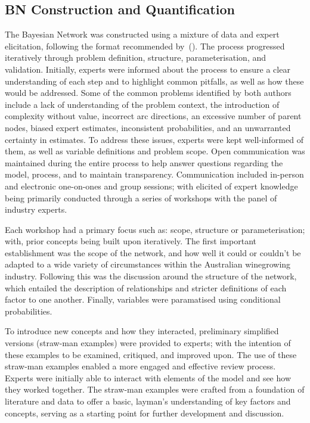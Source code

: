 \documentclass[fleqn,10pt]{wlscirep}
\begin{document}
\subsection*{BN Construction and Quantification}

The Bayesian Network was constructed using a mixture of data and expert elicitation, following the format recommended by~(\cite{korbBayesianArtificialIntelligence2011,pitchforthProposedValidationFramework2013}). The process progressed iteratively through problem definition, structure, parameterisation, and validation. Initially, experts were informed about the process to ensure a clear understanding of each step and to highlight common pitfalls, as well as how these would be addressed. Some of the common problems identified by both authors include a lack of understanding of the problem context, the introduction of complexity without value, incorrect arc directions, an excessive number of parent nodes, biased expert estimates, inconsistent probabilities, and an unwarranted certainty in estimates. To address these issues, experts were kept well-informed of them, as well as variable definitions and problem scope. Open communication was maintained during the entire process to help answer questions regarding the model, process, and to maintain transparency. Communication included in-person and electronic one-on-ones and group sessions; with elicited of expert knowledge being primarily conducted through a series of workshops with the panel of industry experts.

Each workshop had a primary focus such as: scope, structure or parameterisation; with, prior concepts being built upon iteratively. The first important establishment was the scope of the network, and how well it could or couldn't be adapted to a wide variety of circumstances within the Australian winegrowing industry. Following this was the discussion around the structure of the network, which entailed the description of relationships and stricter definitions of each factor to one another. Finally, variables were paramatised using conditional probabilities.

To introduce new concepts and how they interacted, preliminary simplified versions (straw-man examples) were provided to experts; with the intention of these examples to be examined, critiqued, and improved upon. The use of these straw-man examples enabled a more engaged and effective review process. Experts were initially able to interact with elements of the model and see how they worked together. The straw-man examples were crafted from a foundation of literature and data to offer a basic, layman's understanding of key factors and concepts, serving as a starting point for further development and discussion. 
\end{document}

